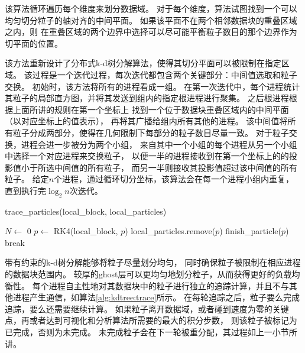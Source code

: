 该算法循环遍历每个维度来划分数据域。
对于每个维度，算法试图找到一个可以均匀切分粒子的轴对齐的中间平面。
如果该平面不在两个相邻数据块的重叠区域之内，则
在重叠区域的两个边界中选择可以尽可能平衡粒子数目的那个边界作为切平面的位置。

该方法重新设计了分布式k-d树分解算法\parencite{MorozovP16}，使得其切分平面可以被限制在指定区域。
该过程是一个迭代过程，每次迭代都包含两个关键部分：中间值选取和粒子交换。
初始时，该方法将所有的进程看成一组。
在第一次迭代中，每个进程统计其粒子的局部直方图，并将其发送到组内的指定根进程进行聚集。
之后根进程根据上面所讲的规则在第一个坐标上
找到一个位于数据块重叠区域内的中间平面（以对应坐标上的值表示），
再将其广播给组内所有其他的进程。
该中间值将所有粒子分成两部分，使得在几何限制下每部分的粒子数目尽量一致。
对于粒子交换，进程会进一步被分为两个小组，
来自其中一个小组的每个进程从另一个小组中选择一个对应进程来交换粒子，
以便一半的进程接收到在第一个坐标上的的投影值小于所选中间值的所有粒子，
而另一半则接收其投影值超过该中间值的所有粒子。
给定$n$个进程，通过循环切分坐标，该算法会在每一个进程小组内重复，
直到执行完$\log_{2}n$次迭代。

\begin{algorithm}
\caption{trace\_particles(local\_block, local\_particles)} 
\label{alg:kdtree:trace}
\begin{algorithmic}
   \State $N \leftarrow$ 0
     \State $p \leftarrow$ RK4(local\_block, $p$)
       \State local\_particles.remove($p$)
       \State finish\_particle($p$)
       \State break
     \EndIf
    \EndWhile
  \EndFor
\end{algorithmic}
\end{algorithm}

带有约束的k-d树分解能够将粒子尽量划分均匀，
同时确保粒子被限制在相应进程的数据块范围内。
较厚的ghost层可以更均匀地划分粒子，从而获得更好的负载均衡性。
每个进程自主性地对其数据块中的粒子进行独立的追踪计算，并且不与其他进程产生通信，如算法\ref{alg:kdtree:trace}所示。
在每轮追踪之后，粒子要么完成追踪，要么还需要继续计算。
如果粒子离开数据域，或者碰到速度为零的关键点，再或者达到可视化和分析算法所需要的最大的积分步数，
则该粒子被标记为已完成，否则为未完成。
未完成粒子会在下一轮被重分配，其过程如上一小节所讲。

